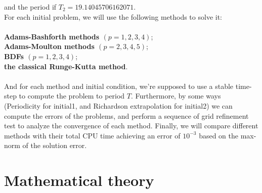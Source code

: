 \documentclass[a4paper,twocolumn]{article}
\theoremstyle{definition}
\begin{document}
and the period if $T_{2}=19.14045706162071 .$\\
For each initial problem, we will use the following methods to solve it:\\\\
\hspace*{1em}\textbf{Adams-Bashforth methods $(p=1,2,3,4)$};\\
\hspace*{1em}\textbf{Adams-Moulton methods $(p=2,3,4,5)$};\\
\hspace*{1em}\textbf{BDFs $(p=1,2,3,4)$};\\
\hspace*{1em}\textbf{the classical Runge-Kutta method}.\\\\
And for each method and initial condition, we're supposed to use a stable time-step to compute the problem to period $T$. Furthermore, by some ways (Periodicity for initial1, and Richardson extrapolation for initial2) we can compute the errors of the problems, and perform a sequence of grid refinement test to analyze the convergence of each method. Finally, we will compare different methods with their total CPU time achieving an error of $10^{-3}$ based on the max-norm of the solution error.
\newpage
\section{Mathematical theory}
\newpage
\end{document}
